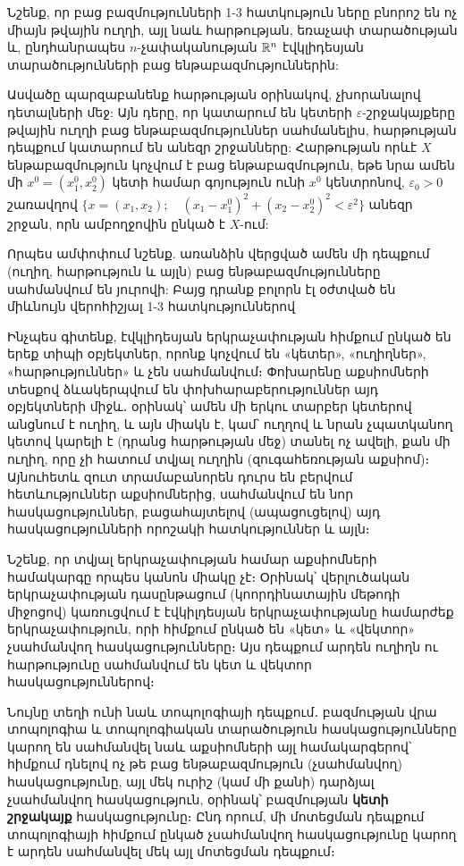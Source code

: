 \documentclass[./main.tex]{subfiles}
\begin{document}
\begin{note}
Նշենք, որ բաց բազմությունների 1-3 հատկություն ները բնորոշ են ոչ միայն թվային ուղղի, այլ նաև հարթության, եռաչափ տարածության և, ընդհանրապես $n$-չափականության $\mathbb{R}^n$ էվկլիդեսյան տարածությունների բաց ենթաբազմություններին:

\par Ասվածը պարզաբանենք հարթության օրինակով, չխորանալով դետալների մեջ: Այն դերը, որ կատարում են կետերի $\varepsilon$-շրջակայքերը թվային ուղղի բաց ենթաբազմություններ սահմանելիս, հարթության դեպքում կատարում են անեզր շրջանները: Հարթության որևէ $X$ ենթաբազմություն կոչվում է բաց ենթաբազմություն, եթե նրա ամեն մի $x^0=(x_1^0, x_2^0)$ կետի համար գոյություն ունի $x^0$ կենտրոնով, $\varepsilon_0 > 0$ շառավղով $\{x=(x_1, x_2); \quad (x_1 - x_1^0)^2 + (x_2 - x_2^0)^2 < \varepsilon^2\}$ անեզր շրջան, որն ամբողջովին ընկած է $X$-ում:

\par Որպես ամփոփում նշենք. առանձին վերցված ամեն մի դեպքում (ուղիղ, հարթություն և այլն) բաց ենթաբազմությունները սահմանվում են յուրովի: Բայց դրանք բոլորն էլ օժտված են միևնույն վերոհիշյալ
1-3 հատկություններով
\end{note}

\begin{note}
    Ինչպես գիտենք, էվկլիդեսյան երկրաչափության հիմքում ըն\-կած են երեք տիպի օբյեկտներ, որոնք կոչվում են «կետեր», «ուղիղներ», «հար\-թու\-թյուն\-ներ» և չեն սահմանվում։ Փոխարենը աքսիոմների տեսքով ձևակերպվում են փոխ\-հա\-րա\-բե\-րություններ այդ օբյեկտների միջև․ օրինակ՝ ամեն մի երկու տարբեր կե\-տե\-րով անցնում է ուղիղ, և այն միակն է, կամ՝ ուղղով և նրան չպատկանող կետով կարելի է (դրանց հարթության մեջ) տանել ոչ ավելի, քան մի ուղիղ, որը չի հատում տվյալ ուղղին (զուգահեռության աքսիոմ)։ Այնուհետև զուտ տրամաբանորեն դուրս են բերվում հետևություններ աքսիոմներից, սահմանվում են նոր հասկացություններ, բացահայտելով (ապացուցելով) այդ հասկացությունների որոշակի հատկություններ և այլն։
\end{note}

\par Նշենք, որ տվյալ երկրաչափության համար աքսիոմների համակարգը որպես կանոն միակը չէ։ Օրինակ՝ վերլուծական երկրաչափության դասընթացում (կոորդի\-նա\-տային մեթոդի միջոցով) կառուցվում է էվկիլդեսյան երկրաչափությանը համ\-արժեք երկրաչափություն, որի հիմքում ընկած են «կետ» և «վեկտոր» չսահմանվող հասկացու\-թյունները։ Այս դեպքում արդեն ուղիղն ու հարթությունը սահմանվում են կետ և վեկտոր հասկացու\-թյուններով։

\par Նույնը տեղի ունի նաև տոպոլոգիայի դեպքում․ բազմության վրա տոպոլոգիա և տոպոլոգիական տարածություն հասկացությունները կարող են սահմանվել նաև աքսիոմների այլ համակարգերով՝ հիմքում դնելով ոչ թե բաց ենթաբազմություն (չսահմանվող) հասկա\-ցությունը, այլ մեկ ուրիշ (կամ մի քանի) դարձյալ չսահմանվող հասկացություն, օրինակ՝ բազմության \textbf{կետի շրջակայք} հասկացությունը։ Ընդ որում, մի մոտեցման դեպքում տոպոլոգիայի հիմքում ընկած չսահմանվող հաս\-կա\-ցությունը կարող է արդեն սահմանվել մեկ այլ մոտեցման դեպքում։
\end{document}

